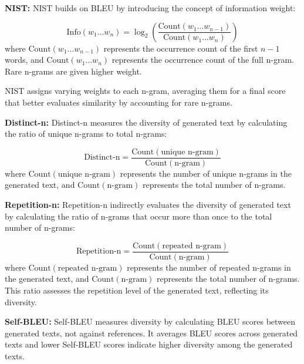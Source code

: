 \documentclass[acmsmall, screen]{acmart}
\begin{document}
\textbf{NIST\cite{doddington_hlt02_nist}:} NIST builds on BLEU by introducing the concept of information weight:

\begin{equation}
\text{Info}(w_1 \ldots w_n) = \log_2 \left( \frac{\text{Count}(w_1 \ldots w_{n-1})}{\text{Count}(w_1 \ldots w_n)} \right)
\end{equation}
where \(\text{Count}(w_1 \ldots w_{n-1})\) represents the occurrence count of the first \(n-1\) words, and \(\text{Count}(w_1 \ldots w_n)\) represents the occurrence count of the full n-gram. Rare n-grams are given higher weight.

NIST assigns varying weights to each n-gram, averaging them for a final score that better evaluates similarity by accounting for rare n-grams.

\textbf{Distinct-n\cite{li_naacl16_diversity}:} Distinct-n measures the diversity of generated text by calculating the ratio of unique n-grams to total n-grams:

\begin{equation}
\text{Distinct-n} = \frac{\text{Count}\left(\text{unique n-gram}\right)}{\text{Count}\left(\text{n-gram}\right)}
\end{equation}
where \(\text{Count}(\text{unique n-gram})\) represents the number of unique n-grams in the generated text, and \(\text{Count}(\text{n-gram})\) represents the total number of n-grams.

\textbf{Repetition-n\cite{shao_emnlp19_repetition}:} Repetition-n indirectly evaluates the diversity of generated text by calculating the ratio of n-grams that occur more than once to the total number of n-grams:

\begin{equation}
\text{Repetition-n} = \frac{\text{Count}\left(\text{repeated n-gram}\right)}{\text{Count}\left(\text{n-gram}\right)}
\end{equation}
where \(\text{Count}(\text{repeated n-gram})\) represents the number of repeated n-grams in the generated text, and \(\text{Count}\left(\text{n-gram}\right)\) represents the total number of n-grams. This ratio assesses the repetition level of the generated text, reflecting its diversity.

\textbf{Self-BLEU\cite{zhu_sigir18_selfbleu}:} Self-BLEU measures diversity by calculating BLEU scores between generated texts, not against references. It averages BLEU scores across generated texts and lower Self-BLEU scores indicate higher diversity among the generated texts.
\end{document}
